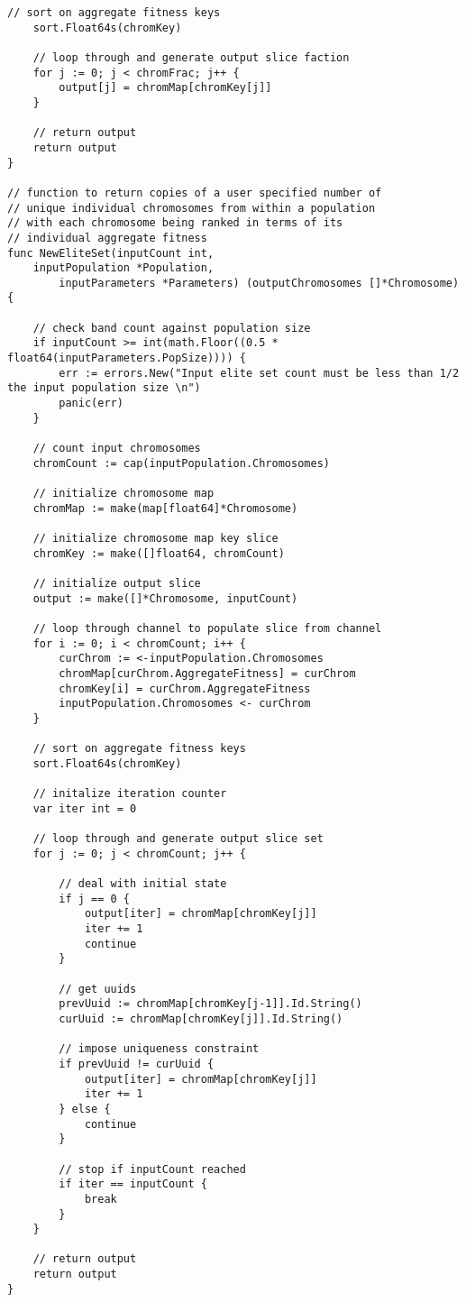 \begin{lstlisting}[basicstyle=\tiny]
	// sort on aggregate fitness keys
	sort.Float64s(chromKey)

	// loop through and generate output slice faction
	for j := 0; j < chromFrac; j++ {
		output[j] = chromMap[chromKey[j]]
	}

	// return output
	return output
}

// function to return copies of a user specified number of
// unique individual chromosomes from within a population
// with each chromosome being ranked in terms of its
// individual aggregate fitness
func NewEliteSet(inputCount int, 
    inputPopulation *Population, 
        inputParameters *Parameters) (outputChromosomes []*Chromosome) {

	// check band count against population size
	if inputCount >= int(math.Floor((0.5 * float64(inputParameters.PopSize)))) {
		err := errors.New("Input elite set count must be less than 1/2 the input population size \n")
		panic(err)
	}

	// count input chromosomes
	chromCount := cap(inputPopulation.Chromosomes)

	// initialize chromosome map
	chromMap := make(map[float64]*Chromosome)

	// initialize chromosome map key slice
	chromKey := make([]float64, chromCount)

	// initialize output slice
	output := make([]*Chromosome, inputCount)

	// loop through channel to populate slice from channel
	for i := 0; i < chromCount; i++ {
		curChrom := <-inputPopulation.Chromosomes
		chromMap[curChrom.AggregateFitness] = curChrom
		chromKey[i] = curChrom.AggregateFitness
		inputPopulation.Chromosomes <- curChrom
	}

	// sort on aggregate fitness keys
	sort.Float64s(chromKey)

	// initalize iteration counter
	var iter int = 0

	// loop through and generate output slice set
	for j := 0; j < chromCount; j++ {

		// deal with initial state
		if j == 0 {
			output[iter] = chromMap[chromKey[j]]
			iter += 1
			continue
		}

		// get uuids
		prevUuid := chromMap[chromKey[j-1]].Id.String()
		curUuid := chromMap[chromKey[j]].Id.String()

		// impose uniqueness constraint
		if prevUuid != curUuid {
			output[iter] = chromMap[chromKey[j]]
			iter += 1
		} else {
			continue
		}

		// stop if inputCount reached
		if iter == inputCount {
			break
		}
	}

	// return output
	return output
}

\end{lstlisting}

